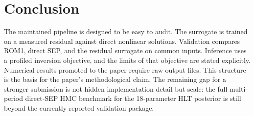 \documentclass[12pt]{article}
\begin{document}
\section{Conclusion}
\label{apptech:conclusion}

The maintained pipeline is designed to be easy to audit. The surrogate is
trained on a measured residual against direct nonlinear solutions. Validation
compares ROM1, direct SEP, and the residual surrogate on common inputs.
Inference uses a profiled inversion objective, and the limits of that objective
are stated explicitly. Numerical results promoted to the paper require raw
output files.
This structure is the basis for the paper's methodological claim. The remaining
gap for a stronger submission is not hidden implementation detail but scale:
the full multi-period direct-SEP HMC benchmark for the 18-parameter HLT
posterior is still beyond the currently reported validation package.



\end{document}

